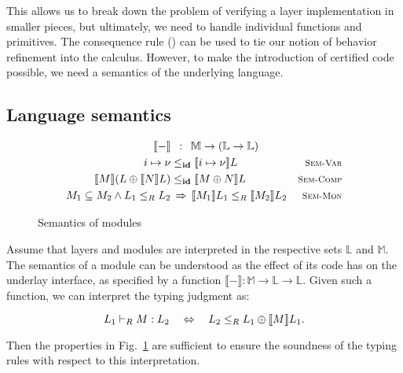 This allows us to break down the problem of verifying a layer
implementation in smaller pieces, but ultimately, we need to handle
individual functions and primitives.  The consequence rule
() can be used to tie our notion of behavior
refinement into the calculus.  However, to make the introduction of
certified code possible, we need a semantics of the underlying
language.

\subsection{Language semantics}
\label{ssec:layer-langsem}

\begin{figure}
\begin{align*}%
\llbracket - \rrbracket &\ \,:\ \,\mathbb{M} \rightarrow (\mathbb{L} \rightarrow \mathbb{L}) \\
        i \mapsto \nu &\lpath{\id}
            \llbracket i \mapsto \nu \rrbracket L &
            \rulename{Sem-Var} \\
        \llbracket M \rrbracket (L \oplus \llbracket N \rrbracket L)
            &\lpath{\id}
            \llbracket M \oplus N \rrbracket L &
            \rulename{Sem-Comp} \\
        M_1 \subseteq M_2 \wedge L_1 \lpath{R} L_2 &\,\Rightarrow\,
            \llbracket M_1 \rrbracket L_1 \lpath{R}
            \llbracket M_2 \rrbracket L_2 &
            \rulename{Sem-Mon}%
\end{align*}
\caption{Semantics of modules}
\label{fig:msem}
\end{figure}

Assume that layers and modules are interpreted in the respective sets
$\mathbb{L}$ and $\mathbb{M}$.  The semantics of a module can be
understood as the effect of its code has on the underlay
interface, as specified by a function $\llbracket - \rrbracket :
\mathbb{M} \rightarrow \mathbb{L} \rightarrow \mathbb{L}$.  Given such
a function, we can interpret the typing judgment as:

\vspace*{-1.5ex}
\begin{small}
\[ L_1 \vdash_{R} M : L_2 \quad \Leftrightarrow \quad
   L_2 \le_{R} L_1 \oplus \llbracket M \rrbracket L_1. \]
\end{small}%

\noindent{}Then the properties in Fig.~\ref{fig:msem}
are sufficient to ensure the soundness of the typing rules
with respect to this interpretation.

